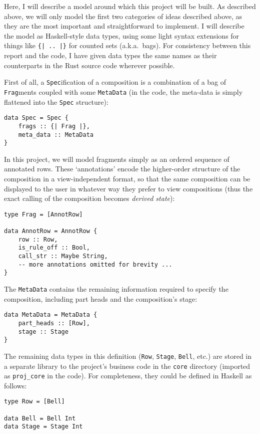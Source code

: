 \documentclass[12pt]{article}
\begin{document}
Here, I will describe a model around which this project will be built.  As described above, we will
only model the first two categories of ideas described above, as they are the most important and
straightforward to implement.  I will describe the model as Haskell-style data types, using some
light syntax extensions for things like \verb+{| .. |}+ for counted sets (a.k.a.\ bags).  For
consistency between this report and the code, I have given data types the same
names as their counterparts in the Rust source code wherever possible.

First of all, a \verb|Spec|ification of a composition is a combination of a bag of \verb|Frag|ments
coupled with some \verb|MetaData| (in the code, the meta-data is simply flattened into the
\verb|Spec| structure):

\begin{verbatim}
data Spec = Spec {
    frags :: {| Frag |},
    meta_data :: MetaData
}
\end{verbatim}

In this project, we will model fragments simply as an ordered sequence of annotated rows.  These
`annotations' encode the higher-order structure of the composition in a view-independent format,
so that the same composition can be displayed to the user in whatever way they prefer to view
compositions (thus the exact calling of the composition becomes \emph{derived state}):

\begin{verbatim}
type Frag = [AnnotRow]

data AnnotRow = AnnotRow {
    row :: Row,
    is_rule_off :: Bool,
    call_str :: Maybe String,
    -- more annotations omitted for brevity ...
}
\end{verbatim}

The \verb|MetaData| contains the remaining information required to specify the composition,
including part heads and the composition's stage:

\begin{verbatim}
data MetaData = MetaData {
    part_heads :: [Row],
    stage :: Stage
}
\end{verbatim}

The remaining data types in this definition (\verb|Row|, \verb|Stage|, \verb|Bell|, etc.) are stored
in a separate library to the project's business code in the \verb|core| directory (imported as
\verb|proj_core| in the code).  For completeness, they could be defined in Haskell as follows:

\begin{verbatim}
type Row = [Bell]

data Bell = Bell Int
data Stage = Stage Int
\end{verbatim}
\end{document}
